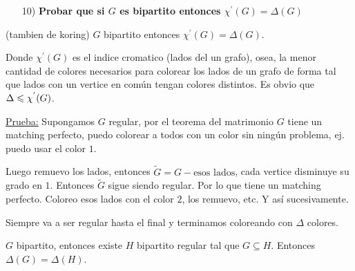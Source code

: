 \documentclass[12pt,a4paper]{article}
\begin{document}
\begin{itemize}
    \item [10)] \textbf{Probar que si $G$ es bipartito entonces 
    $\chi^{'}(G) = \Delta(G)$}
    \label{dem:chi}
\end{itemize}

\begin{corolario} (tambien de koring) $G$ bipartito entonces $\chi^{'}(G) = \Delta(G)$.
\end{corolario}

Donde $\chi^{'}(G)$ es el indice cromatico (lados del un grafo), osea, la menor 
cantidad de colores necesarios para colorear los lados de un grafo de forma tal 
que lados con un vertice en común tengan colores distintos. Es obvio que $\Delta \leqslant \chi^{'}(G)$.
\begin{figure}[H]
    \centering
\end{figure}

\underline{Prueba:} Supongamos $G$ regular, por el teorema del matrimonio $G$ 
tiene un matching perfecto, puedo colorear a todos con un color sin ningún 
problema, ej. puedo usar el color $1$.
\medskip

Luego remuevo los lados, entonces $\widetilde{G} = G -\text{esos lados}$, cada 
vertice disminuye su grado en $1$. Entonces $\widetilde{G}$ sigue siendo regular. 
Por lo que tiene un matching perfecto. Coloreo esos lados con el color $2$, los 
remuevo, etc. Y así sucesivamente.
\medskip

Siempre va a ser regular hasta el final y terminamos coloreando con $\Delta$ 
colores. 

\begin{lema} $G$ bipartito, entonces existe $H$ bipartito regular tal que 
    $G \subseteq H$. Entonces $\Delta(G) = \Delta(H)$.
\end{lema}
\end{document}
